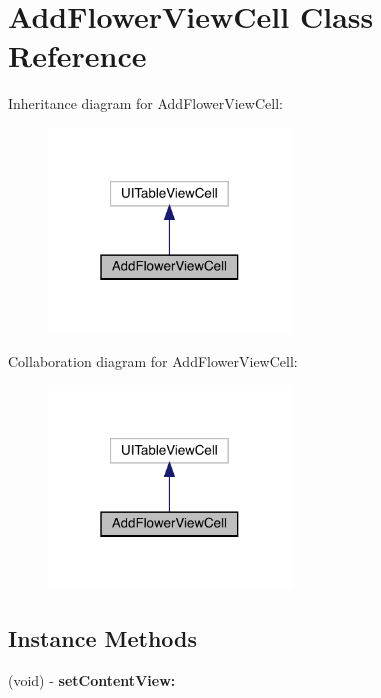 \hypertarget{interface_add_flower_view_cell}{}\section{Add\+Flower\+View\+Cell Class Reference}
\label{interface_add_flower_view_cell}


Inheritance diagram for Add\+Flower\+View\+Cell\+:\nopagebreak
\begin{figure}[H]
\begin{center}
\leavevmode
\includegraphics[width=183pt]{interface_add_flower_view_cell__inherit__graph}
\end{center}
\end{figure}


Collaboration diagram for Add\+Flower\+View\+Cell\+:\nopagebreak
\begin{figure}[H]
\begin{center}
\leavevmode
\includegraphics[width=183pt]{interface_add_flower_view_cell__coll__graph}
\end{center}
\end{figure}
\subsection*{Instance Methods}
\begin{DoxyCompactItemize}
\item 
\mbox{\label{interface_add_flower_view_cell_aecfa69dd652a577deaeb4fa0d64feb5c}} 
(void) -\/ {\bfseries set\+Content\+View\+:}
\end{DoxyCompactItemize}
